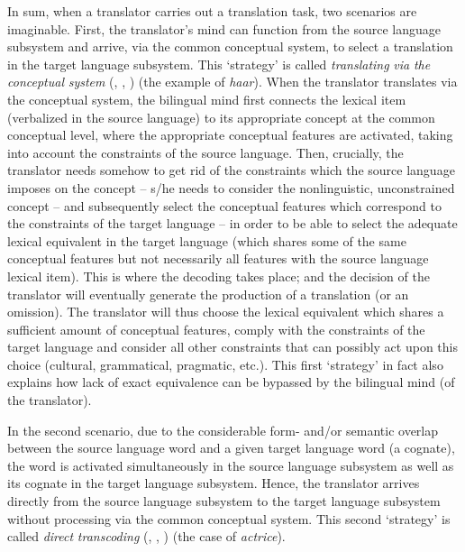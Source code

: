 In sum, when a translator carries out a translation task, two scenarios are imaginable. First, the translator’s mind can function from the source language subsystem and arrive, via the common conceptual system, to select a translation in the target language subsystem. This ‘strategy’ is called \textit{translating} \textit{via} \textit{the} \textit{conceptual} \textit{system} (\citealt[54-55]{house_towards_2013}, \citeyear{house_translation_2015}, \citeyear[119-20]{house_translation_2016}) (the example of \textit{haar}). When the translator translates via the conceptual system, the bilingual mind first connects the lexical item (verbalized in the source language) to its appropriate concept at the common conceptual level, where the appropriate conceptual features are activated, taking into account the constraints of the source language. Then, crucially, the translator needs somehow to get rid of the constraints which the source language imposes on the concept – s/he needs to consider the nonlinguistic, unconstrained concept – and subsequently select the conceptual features which correspond to the constraints of the target language – in order to be able to select the adequate lexical equivalent in the target language (which shares some of the same conceptual features but not necessarily all features with the source language lexical item). This is where the decoding takes place; and the decision of the translator will eventually generate the production of a translation (or an omission). The translator will thus choose the lexical equivalent which shares a sufficient amount of conceptual features, comply with the constraints of the target language and consider all other constraints that can possibly act upon this choice (cultural, grammatical, pragmatic, etc.). This first ‘strategy’ in fact also explains how lack of exact equivalence can be bypassed by the bilingual mind (of the translator).

In the second scenario, due to the considerable form- and/or semantic overlap between the source language word and a given target language word (a cognate), the word is activated simultaneously in the source language subsystem as well as its cognate in the target language subsystem. Hence, the translator arrives directly from the source language subsystem to the target language subsystem without processing via the common conceptual system. This second ‘strategy’ is called \textit{direct} \textit{transcoding} (\citealt[54-55]{house_towards_2013}, \citeyear{house_translation_2015}, \citeyear[119-120]{house_translation_2016}) (the case of \textit{actrice}).

